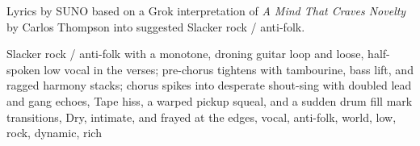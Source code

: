 
\begin{notes}
Lyrics by SUNO based on a Grok interpretation of \emph{A Mind That Craves Novelty} by Carlos Thompson into suggested Slacker rock / anti-folk.
\end{notes}
\begin{style}
Slacker rock / anti-folk with a monotone, droning guitar loop and loose, half-spoken low vocal in the verses; pre-chorus tightens with tambourine, bass lift, and ragged harmony stacks; chorus spikes into desperate shout-sing with doubled lead and gang echoes, Tape hiss, a warped pickup squeal, and a sudden drum fill mark transitions, Dry, intimate, and frayed at the edges, vocal, anti-folk, world, low, rock, dynamic, rich
\end{style}
